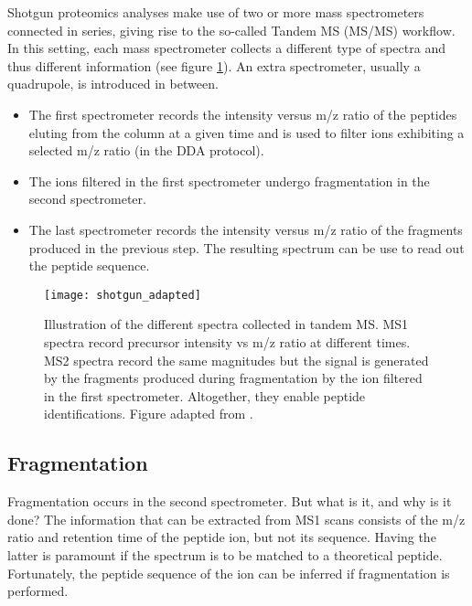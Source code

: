 
Shotgun proteomics analyses make use of two or more mass spectrometers connected in series, giving rise to the so-called Tandem MS (\ac{MS/MS}) workflow. In this setting, each mass spectrometer collects a different type of spectra and thus different information (see figure \ref{fig:shotgun}). An extra spectrometer, usually a quadrupole, is introduced in between.

\begin{itemize}

\item The first spectrometer records the intensity versus \ac{m/z} ratio of the peptides eluting from the column at a given time and is used to filter ions exhibiting a selected \ac{m/z} ratio (in the \ac{DDA} protocol).

\item The ions filtered in the first spectrometer undergo fragmentation in the second spectrometer. %

\item The last spectrometer records the intensity versus \ac{m/z} ratio of the fragments produced in the previous step. The resulting spectrum can be use to read out the peptide sequence.

\end{itemize}

\begin{figure}[!h]
\centering
\texttt{[image: shotgun\_adapted]}
\caption[MS/MS spectra]{Illustration of the different spectra collected in tandem MS. MS1 spectra record precursor intensity vs \ac{m/z} ratio at different times. MS2 spectra record the same magnitudes but the signal is generated by the fragments produced during fragmentation by the ion filtered in the first spectrometer. Altogether, they enable peptide identifications. Figure adapted from \cite{Verheggen2017}.}
\label{fig:shotgun}
\end{figure}

\subsection{Fragmentation}
\label{subsec:fragmentation}

Fragmentation occurs in the second spectrometer. But what is it, and why is it done? The information that can be extracted from \ac{MS1} scans consists of the \ac{m/z} ratio and retention time of the peptide ion, but not its sequence. Having the latter is paramount if the spectrum is to be matched to a theoretical peptide. Fortunately, the peptide sequence of the ion can be inferred if fragmentation is performed.

